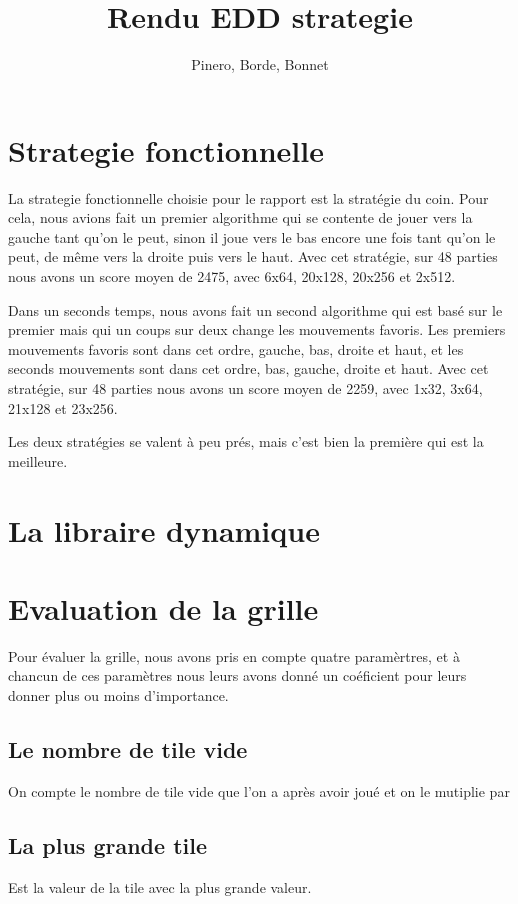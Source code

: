 \documentclass{article}
\title{Rendu EDD strategie}
\author{Pinero, Borde, Bonnet}
\begin{document}
\maketitle
\tableofcontents

\newpage
\section{Strategie fonctionnelle}
La strategie fonctionnelle choisie pour le rapport est la stratégie du coin. Pour cela, nous avions fait un premier algorithme qui se contente de jouer vers la gauche tant qu'on le peut, sinon il joue vers le bas encore une fois tant qu'on le peut, de même vers la droite puis vers le haut. Avec cet stratégie, sur 48 parties nous avons un score moyen de 2475, avec 6x64, 20x128, 20x256 et 2x512.

Dans un seconds temps, nous avons fait un second algorithme qui est basé sur le premier mais qui un coups sur deux change les mouvements favoris. Les premiers mouvements favoris sont dans cet ordre, gauche, bas, droite et haut, et les seconds mouvements sont dans cet ordre, bas, gauche, droite et haut. Avec cet stratégie, sur 48 parties nous avons un score moyen de 2259, avec 1x32, 3x64, 21x128 et 23x256.

Les deux stratégies se valent à peu prés, mais c'est bien la première qui est la meilleure.

\section{La libraire dynamique}

\clearpage
\section{Evaluation de la grille}
\label{eval_grid}
Pour évaluer la grille, nous avons pris en compte quatre paramèrtres, et à chancun de ces paramètres nous leurs avons donné un coéficient pour leurs donner plus ou moins d'importance. 


	\subsection{Le nombre de tile vide}
	On compte le nombre de tile vide que l'on a après avoir joué et on le mutiplie par

	\subsection{La plus grande tile} 
	Est la valeur de la tile avec la plus grande valeur.
\end{document}
